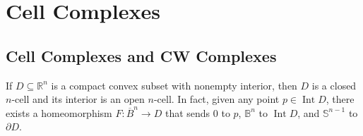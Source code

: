 \chapter{Cell Complexes}

\section{Cell Complexes and CW Complexes}

\begin{prop}{5.1}
	If $D\subseteq \mathbb{R}^{n}$ is a compact convex subset with nonempty interior, then $D$ is a closed $n$-cell and its interior is an open $n$-cell. In fact, given any point $p \in \operatorname{Int}D$, there exists a homeomorphism $F: \overline{B}^{n} \to D$ that sends 0 to $p$, $\mathbb{B}^{n}$ to $\operatorname{Int}D$, and $\mathbb{S}^{n-1}$ to $\partial D$.
\end{prop}

